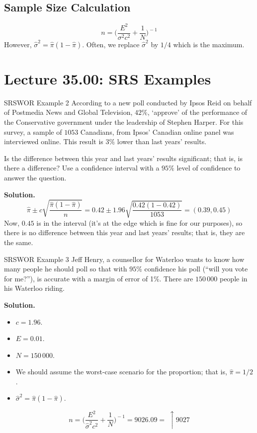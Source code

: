 \subsection*{Sample Size Calculation}
\[ n=\biggl(\frac{E^2}{\sigma^2c^2} +\frac{1}{N} \biggr)^{\!-1} \]
However, $ \hat{\sigma}^2=\hat{\pi}(1-\hat{\pi}) $. Often,
we replace $ \hat{\sigma}^2 $ by $ 1/4 $ which is the maximum.

\section{Lecture 35.00: SRS Examples}
\begin{Example}{SRSWOR Example 2}{}
    According to a new poll conducted by Ipsos Reid
    on behalf of Postmedia News and Global Television,
    $42\%$, `approve' of the performance of the Conservative
    government under the leadership of Stephen
    Harper. For this survey, a sample of $1053$ Canadians,
    from Ipsos' Canadian online panel was interviewed online.
    This result is $3\%$ lower than last years' results.

    Is the difference between this year and last years' results significant;
    that is, is there a difference? Use a
    confidence interval with a $95\%$ level of confidence to answer the question.

    \textbf{Solution.}
    \[ \hat{\pi}\pm c\sqrt{\frac{\hat{\pi}(1-\hat{\pi})}{n}}=0.42\pm 1.96\sqrt{\frac{0.42(1-0.42)}{1053}}
        =(0.39,0.45) \]
    Now, $ 0.45 $ is in the interval (it's at the edge which is fine for
    our purposes), so there is no difference between
    this year and last years' results; that is, they are the same.
\end{Example}
\begin{Example}{SRSWOR Example 3}{}
    Jeff Henry, a counsellor for Waterloo wants to know how many people
    he should poll so that with $95\%$
    confidence his poll (``will you vote for me?''),
    is accurate with a margin of error of 1\%. There are $150\,000$
    people in his Waterloo riding.

    \textbf{Solution.}
    \begin{itemize}
        \item $ c=1.96 $.
        \item $ E=0.01 $.
        \item $ N=150\,000 $.
        \item We should assume the worst-case scenario for the proportion;
              that is, $ \hat{\pi}=1/2 $.
        \item $ \hat{\sigma}^2=\hat{\pi}(1-\hat{\pi}) $.
    \end{itemize}
    \[ n=\biggl(\frac{E^2}{\hat{\sigma}^2c^2}+\frac{1}{N} \biggr)^{\!-1}
        =9026.09=\;\uparrow 9027 \]
\end{Example}
